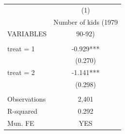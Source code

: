 \begin{tabular}{lc} \hline
 & (1) \\
 & Number of kids (1979 \\
VARIABLES & 90-92) \\ \hline
 &  \\
treat = 1 & -0.929*** \\
 & (0.270) \\
treat = 2 & -1.141*** \\
 & (0.298) \\
 &  \\
Observations & 2,401 \\
R-squared & 0.292 \\
 Mun. FE & YES \\ \hline
\end{tabular}
